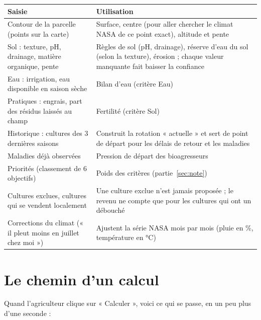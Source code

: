 \documentclass[11pt,a4paper]{article}
\begin{document}
\begin{center}
\begin{tabularx}{\textwidth}{L{3.4cm}Y}
\toprule
\textbf{Saisie} & \textbf{Utilisation} \\
\midrule
Contour de la parcelle (points sur la carte) & Surface, centre (pour aller chercher le climat NASA de ce point exact), altitude et pente \\
Sol : texture, pH, drainage, matière organique, pente & Règles de sol (pH, drainage), réserve d'eau du sol (selon la texture), érosion ; chaque valeur manquante fait baisser la confiance \\
Eau : irrigation, eau disponible en saison sèche & Bilan d'eau (critère Eau) \\
Pratiques : engrais, part des résidus laissés au champ & Fertilité (critère Sol) \\
Historique : cultures des 3 dernières saisons & Construit la rotation « actuelle » et sert de point de départ pour les délais de retour et les maladies \\
Maladies déjà observées & Pression de départ des bioagresseurs \\
Priorités (classement de 6 objectifs) & Poids des critères (partie~\ref{sec:note}) \\
Cultures exclues, cultures qui se vendent localement & Une culture exclue n'est jamais proposée ; le revenu ne compte que pour les cultures qui ont un débouché \\
Corrections du climat (« il pleut moins en juillet chez moi ») & Ajustent la série NASA mois par mois (pluie en \%, température en °C) \\
\bottomrule
\end{tabularx}
\end{center}

\clearpage
\section{Le chemin d'un calcul}

Quand l'agriculteur clique sur « Calculer », voici ce qui se passe, en un peu plus d'une seconde :
\end{document}
